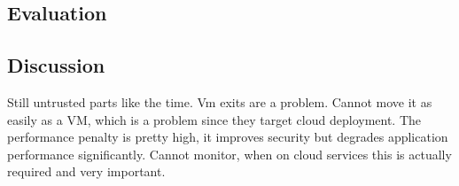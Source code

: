 %
% 
% 
% 
% 
% 
% 
% 
% 
\subsection{Evaluation}



\subsection{Discussion}

Still untrusted parts like the time.
Vm exits are a problem.
Cannot move it as easily as a VM, which is a problem since they target cloud deployment.
The performance penalty is pretty high, it improves security but degrades application performance significantly.
Cannot monitor, when on cloud services this is actually required and very important.\\

